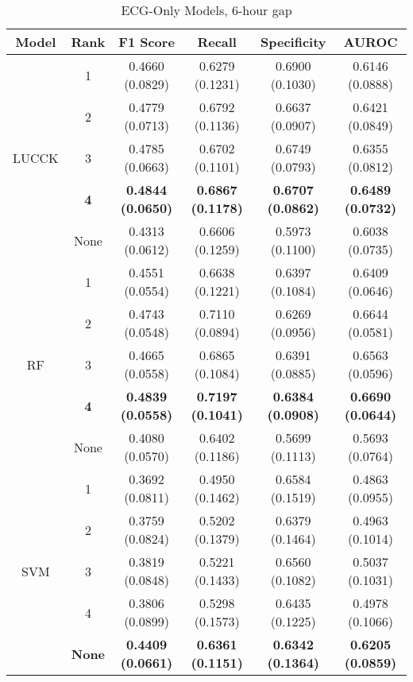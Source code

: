 

\begin{table}
    \centering
    \caption{ECG-Only Models, 6-hour gap}
    \begin{tabularx}{\textwidth}{|C|C|C|C|C|C|}
    \hline
        Model & Rank & F1 Score & Recall & Specificity & AUROC \\
        \hline
          & 1 & 0.4660 (0.0829) & 0.6279 (0.1231) & 0.6900 (0.1030) & 0.6146 (0.0888)\\
          & 2 & 0.4779 (0.0713) & 0.6792 (0.1136) & 0.6637 (0.0907) & 0.6421 (0.0849)\\
         LUCCK & 3 & 0.4785 (0.0663) & 0.6702 (0.1101) & 0.6749 (0.0793) & 0.6355 (0.0812)\\
          & \textbf{4} & \textbf{0.4844 (0.0650)} & 
         \textbf{0.6867 (0.1178)} & \textbf{0.6707 (0.0862)} & \textbf{0.6489 (0.0732)}\\
          & None & 0.4313 (0.0612) & 0.6606 (0.1259) & 0.5973 (0.1100) & 0.6038 (0.0735)\\
        \hline
         & 1 & 0.4551 (0.0554) & 0.6638 (0.1221) & 0.6397 (0.1084) & 0.6409 (0.0646)\\
          & 2 & 0.4743 (0.0548) & 0.7110 (0.0894) & 0.6269 (0.0956) & 0.6644 (0.0581)\\
         RF & 3 & 0.4665 (0.0558) & 0.6865 (0.1084) & 0.6391 (0.0885) & 0.6563 (0.0596)\\
          & \textbf{4} & \textbf{0.4839 (0.0558)} & \textbf{0.7197 (0.1041)} & \textbf{0.6384 (0.0908)} & \textbf{0.6690 (0.0644)}\\
          & None & 0.4080 (0.0570) & 0.6402 (0.1186) & 0.5699 (0.1113) & 0.5693 (0.0764)\\
        \hline
          & 1 & 0.3692 (0.0811) & 0.4950 (0.1462) & 0.6584 (0.1519) & 0.4863 (0.0955)\\
          & 2 & 0.3759 (0.0824) & 0.5202 (0.1379) & 0.6379 (0.1464) & 0.4963 (0.1014)\\
         SVM & 3 & 0.3819 (0.0848) & 0.5221 (0.1433) & 0.6560 (0.1082) & 0.5037 (0.1031)\\
          & 4 & 0.3806 (0.0899) & 0.5298 (0.1573) & 0.6435 (0.1225) & 0.4978 (0.1066)\\
          & \textbf{None} & \textbf{0.4409 (0.0661)} & \textbf{0.6361 (0.1151)} & \textbf{0.6342 (0.1364)} & \textbf{0.6205 (0.0859)}\\
        \hline                 
    \end{tabularx}
\end{table}

